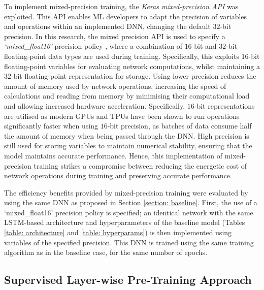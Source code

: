\documentclass[a4paper, 11pt]{report}
\begin{document}
    To implement mixed-precision training, the \emph{Keras mixed-precision API} \citep{abadi-2016} was exploited. This API enables ML developers to adapt the precision of variables and operations within an implemented DNN, changing the default $32$-bit precision. In this research, the mixed precision API is used to specify a \emph{`mixed\_float16'} precision policy \citep{abadi-2016}, where a combination of $16$-bit and $32$-bit floating-point data types are used during training. Specifically, this exploits $16$-bit floating-point variables for evaluating network computations, whilst maintaining a $32$-bit floating-point representation for storage. Using lower precision reduces the amount of memory used by network operations, increasing the speed of calculations and reading from memory by minimising their computational load and allowing increased hardware acceleration. Specifically, $16$-bit representations are utilised as modern GPUs and TPUs have been shown to run operations significantly faster when using $16$-bit precision, as batches of data consume half the amount of memory when being passed through the DNN. High precision is still used for storing variables to maintain numerical stability, ensuring that the model maintains accurate performance. Hence, this implementation of mixed-precision training strikes a compromise between reducing the energetic cost of network operations during training and preserving accurate performance.

    The efficiency benefits provided by mixed-precision training were evaluated by using the same DNN as proposed in Section \ref{section: baseline}. First, the use of a `mixed\_float16' precision policy is specified; an identical network with the same LSTM-based architecture and hyperparameters of the baseline model (Tables \ref{table: architecture} and \ref{table: hyperparams}) is then implemented using variables of the specified precision. This DNN is trained using the same training algorithm as in the baseline case, for the same number of epochs. 


    \subsection{Supervised Layer-wise Pre-Training Approach}
\end{document}
